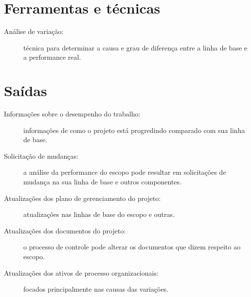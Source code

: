 \section{Ferramentas e técnicas}

\begin{description}
	
	\item[Análise de variação:] técnica para determinar a causa e grau de diferença entre a linha de base e a performance real.
	
\end{description}

\section{Saídas}

\begin{description}
	
	\item[Informações sobre o desempenho do trabalho:] informações de como o projeto está progredindo comparado com sua linha de base.
	
	\item[Solicitação de mudanças:] a análise da performance do escopo pode resultar em solicitações de mudança na sua linha de base e outros componentes.
	
	\item[Atualizações dos plano de gerenciamento do projeto:] atualizações nas linhas de base do escopo e outras.
	
	\item[Atualizações dos documentos do projeto:] o processo de controle pode alterar os documentos que dizem respeito ao escopo.
	
	\item[Atualizações dos ativos de processo organizacionais:] focados principalmente nas causas das variações.
	
\end{description}